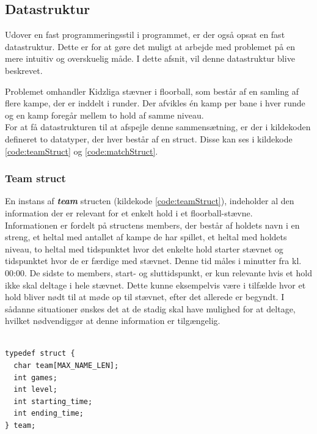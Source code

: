 \subsection*{Datastruktur}
Udover en fast programmeringsstil i programmet, er der også opsat en fast datastruktur. Dette er for at gøre det muligt at arbejde med problemet på en mere intuitiv og overskuelig måde. I dette afsnit, vil denne datastruktur blive beskrevet.
\par
Problemet omhandler Kidzliga stævner i floorball, som består af en samling af flere kampe, der er inddelt i runder. Der afvikles én kamp per bane i hver runde og en  kamp foregår mellem to hold af samme niveau.\\
For at få datastrukturen til at afspejle denne sammensætning, er der i kildekoden defineret to datatyper, der hver består af en struct. Disse kan ses i kildekode \ref{code:teamStruct} og \ref{code:matchStruct}.

\subsubsection{Team struct}
En instans af \textbf{\textit{team}} structen (kildekode \ref{code:teamStruct}), indeholder al den information der er relevant for et enkelt hold i et floorball-stævne. \\
Informationen er fordelt på structens members, der består af holdets navn i en streng, et heltal med antallet af kampe de har spillet, et heltal med holdets niveau, to heltal med tidspunktet hvor det enkelte hold starter stævnet og tidspunktet hvor de er færdige med stævnet. Denne tid måles i minutter fra kl. 00:00.
De sidste to members, start- og sluttidspunkt, er kun relevante hvis et hold ikke skal deltage i hele stævnet. Dette kunne eksempelvis være i tilfælde hvor et hold bliver nødt til at møde op til stævnet, efter det allerede er begyndt. 
I sådanne situationer ønskes det at de stadig skal have mulighed for at deltage, hvilket nødvendiggør at denne information er tilgængelig.
\begin{listing}[H]
\begin{verbatim}

typedef struct {
  char team[MAX_NAME_LEN];
  int games;
  int level;
  int starting_time;
  int ending_time;
} team;

\end{verbatim}
\label{code:teamStruct}
\end{listing}


